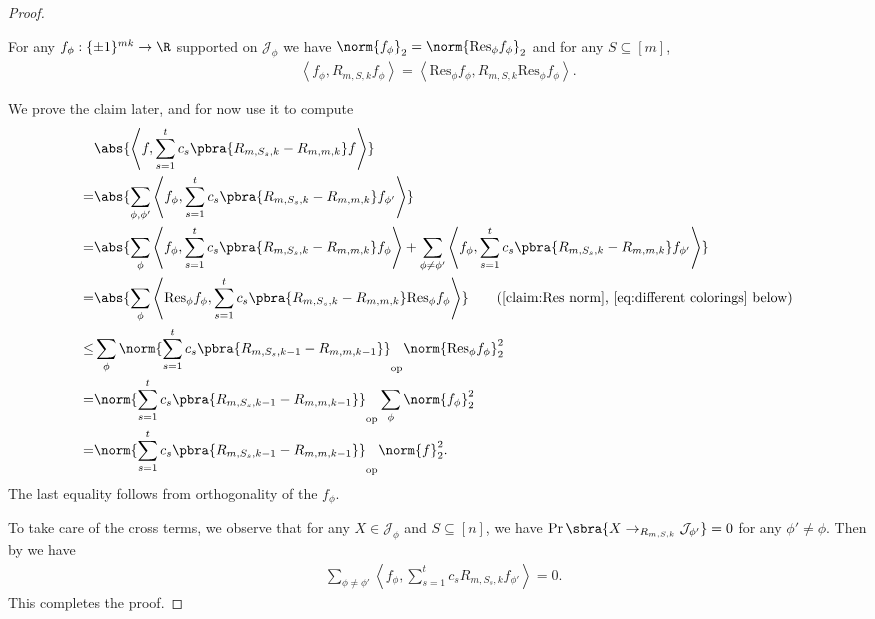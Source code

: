 \begin{proof}
    \begin{claim}\label{claim:Res norm}
        For any $f_\phi:{\{\pm1\}^{mk}}\to \R$ supported on $\mathcal{J}_\phi$ we have $\norm{f_\phi}_2=\norm{\mathrm{Res}_\phi f_\phi}_2$ and for any $S\subseteq[m]$,
        \begin{align*}
        \left\langle f_\phi,R_{m,S,k}f_\phi\right\rangle = \left\langle \mathrm{Res}_\phi f_\phi,R_{m,S,k}\mathrm{Res}_\phi f_\phi\right\rangle.
    \end{align*}
    \end{claim}
    We prove the claim later, and for now use it to compute
    \begin{align*}
        &\abs{\left\langle f,\sum_{s=1}^t c_s \pbra{R_{m,S_s,k}-R_{m,m,k}}f\right\rangle} \\
        =&\abs{\sum_{\phi,\phi'}\left\langle f_\phi , \sum_{s=1}^t c_s \pbra{R_{m,S_s,k}-R_{m,m,k}}f_{\phi'}\right\rangle} \\
        =&\abs{\sum_{\phi}\left\langle f_\phi , \sum_{s=1}^t c_s \pbra{R_{m,S_s,k}-R_{m,m,k}}f_{\phi}\right\rangle + \sum_{\phi\neq \phi'}\left\langle f_\phi , \sum_{s=1}^t c_s \pbra{R_{m,S_s,k}-R_{m,m,k}}f_{\phi'}\right\rangle} \\
        =&\abs{\sum_{\phi}\left\langle \mathrm{Res}_\phi f_\phi,\sum_{s=1}^t c_s \pbra{R_{m,S_s,k}-R_{m,m,k}}\mathrm{Res}_\phi f_\phi \right\rangle} \tag{\Cref{claim:Res norm}, \Cref{eq:different colorings} below}\\
        \leq & \sum_{\phi}\norm{\sum_{s=1}^t c_s \pbra{R_{m,S_s,k-1}-R_{m,m,k-1}}}_{\mathrm{op}}\norm{\mathrm{Res}_\phi f_\phi}_2^2 \\
        =&\norm{\sum_{s=1}^t c_s \pbra{R_{m,S_s,k-1}-R_{m,m,k-1}}}_{\mathrm{op}}\sum_{\phi}\norm{f_\phi}_2^2\\
        =& \norm{\sum_{s=1}^t c_s \pbra{R_{m,S_s,k-1}-R_{m,m,k-1}}}_{\mathrm{op}}\norm{f}_2^2.
    \end{align*}
    The last equality follows from orthogonality of the $f_\phi$.
    
    To take care of the cross terms, we observe that for any $X\in\mathcal{J}_\phi$ and $S\subseteq[n]$, we have $\Pr\sbra{X\to_{R_{m,S,k}} \mathcal{J}_{\phi'}}=0$ for any $\phi'\neq \phi$. Then by  we have
    \begin{align}\label{eq:different colorings}
        &\sum_{\phi\neq \phi'}\left\langle f_\phi , \sum_{s=1}^t c_s R_{m,S_s,k}f_{\phi'}\right\rangle =0. 
    \end{align}
    This completes the proof.
\end{proof}

